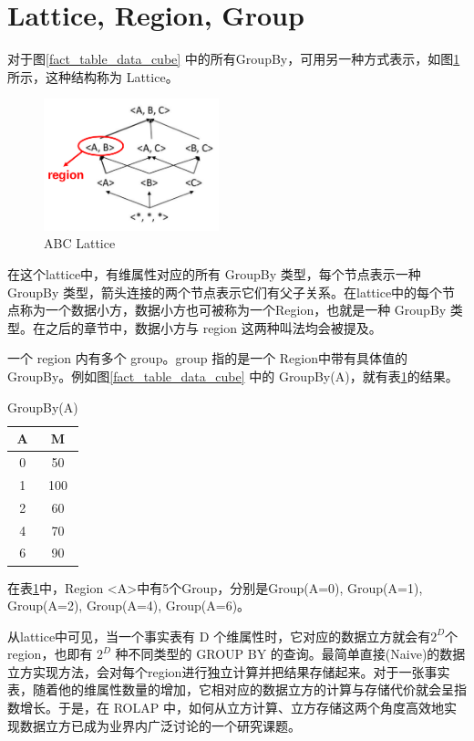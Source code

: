 \section{Lattice, Region, Group}

对于图\ref{fact_table_data_cube} 中的所有GroupBy，可用另一种方式表示，如图\ref{abc_lattice} 所示，这种结构称为 Lattice。

\begin{figure}[!htb]
\centering\includegraphics[width=2in]{picture/ch_preliminary/abc_lattice} 
\caption{ABC Lattice}\label{abc_lattice} 
\end{figure} 

在这个lattice中，有维属性对应的所有 GroupBy 类型，每个节点表示一种 GroupBy 类型，箭头连接的两个节点表示它们有父子关系。在lattice中的每个节点称为一个数据小方，数据小方也可被称为一个Region，也就是一种 GroupBy 类型。在之后的章节中，数据小方与 region 这两种叫法均会被提及。

一个 region 内有多个 group。group 指的是一个
Region中带有具体值的 GroupBy。例如图\ref{fact_table_data_cube} 中的 GroupBy(A)，就有表\ref{groupby_a_table}的结果。

\begin{table}[!hb]
\begin{center}
\begin{tabular}{|c|c|}
\hline 
A & M \\ 
\hline 
0 & 50 \\ 
\hline 
1 & 100 \\ 
\hline 
2 & 60 \\ 
\hline 
4 & 70 \\ 
\hline 
6 & 90 \\ 
\hline 
\end{tabular} 
\end{center}
\caption{GroupBy(A)}\label{groupby_a_table}
\end{table}

在表\ref{groupby_a_table}中，Region \textless A\textgreater 中有5个Group，分别是Group(A=0), Group(A=1), Group(A=2), Group(A=4), Group(A=6)。

从lattice中可见，当一个事实表有 D 个维属性时，它对应的数据立方就会有${2}^{D}$个region，也即有 ${2}^{D}$ 种不同类型的 GROUP BY 的查询。最简单直接(Naive)的数据立方实现方法，会对每个region进行独立计算并把结果存储起来。对于一张事实表，随着他的维属性数量的增加，它相对应的数据立方的计算与存储代价就会呈指数增长。于是，在 ROLAP 中，如何从立方计算、立方存储这两个角度高效地实现数据立方已成为业界内广泛讨论的一个研究课题。


